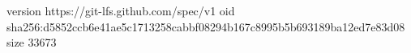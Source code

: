 version https://git-lfs.github.com/spec/v1
oid sha256:d5852ccb6e41ae5c1713258cabbf08294b167c8995b5b693189ba12ed7e83d08
size 33673
